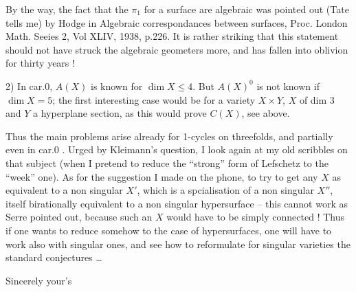 
By the way, the fact that the $\pi_1$ for a surface are algebraic was pointed out (Tate tells me) by Hodge in Algebraic correspondances between surfaces, Proc. London Math.  Seeies 2, Vol XLIV, 1938, p.226. It is rather striking that this statement should not have struck the algebraic geometers more, and has fallen into oblivion for  thirty years !

2) In car.0, $A(X)$ is known for $\dim X\leq4$. But $A(X)^0$ is not known if $\dim X=5$; the first interesting case would be for a variety $X\times Y$, $X$ of dim 3 and $Y$ a hyperplane section, as this would prove $C(X)$, see above.

Thus the main problems arise already for 1-cycles on threefolds, and partially even in car.0 . Urged by Kleimann's question, I  look again at my old scribbles on that subject (when I pretend to reduce the ``strong'' form of Lefschetz to the ``week'' one). As for the suggestion I made on the phone, to try to get any $X$ as  equivalent to a non singular $X'$, which is a spcialisation of a non singular $X''$, itself birationally equivalent to a non singular hypersurface -- this cannot work as Serre pointed out, because such an $X$ would have to be simply connected ! Thus if one wants to reduce somehow to the case of hypersurfaces, one will have to work also with singular ones, and see how to reformulate for singular varieties the standard conjectures \ldots

Sincerely your's

